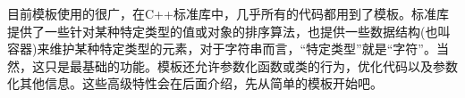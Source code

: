 目前模板使用的很广，在C++标准库中，几乎所有的代码都用到了模板。标准库提供了一些针对某种特定类型的值或对象的排序算法，也提供一些数据结构(也叫容器)来维护某种特定类型的元素，对于字符串而言，“特定类型”就是“字符”。当然，这只是最基础的功能。模板还允许参数化函数或类的行为，优化代码以及参数化其他信息。这些高级特性会在后面介绍，先从简单的模板开始吧。

\pagecolor{white}
\color{black}




% 

% 

% 

% 

% 

% 

